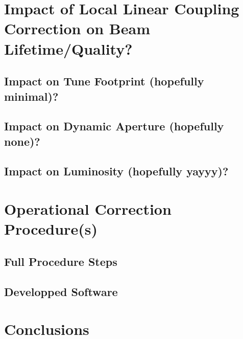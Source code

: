 
\section{Impact of Local Linear Coupling Correction on Beam Lifetime/Quality?}

\subsection{Impact on Tune Footprint (hopefully minimal)?}

\subsection{Impact on Dynamic Aperture (hopefully none)?}

\subsection{Impact on Luminosity (hopefully yayyy)?}


\section{Operational Correction Procedure(s)}

\subsection{Full Procedure Steps}

\subsection{Developped Software}


\section{Conclusions}

